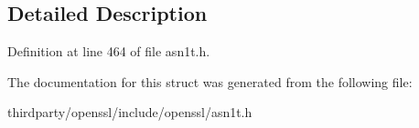 \subsection{Detailed Description}


Definition at line 464 of file asn1t.\+h.



The documentation for this struct was generated from the following file\+:\begin{DoxyCompactItemize}
\item 
thirdparty/openssl/include/openssl/asn1t.\+h\end{DoxyCompactItemize}
